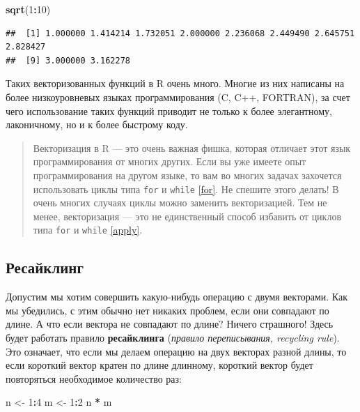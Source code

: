 \documentclass[
]{book}
\newenvironment{Shaded}{\begin{snugshade}}{\end{snugshade}}
\newcommand{\DecValTok}[1]{\textcolor[rgb]{0.00,0.00,0.81}{#1}}
\newcommand{\KeywordTok}[1]{\textcolor[rgb]{0.13,0.29,0.53}{\textbf{#1}}}
\newcommand{\NormalTok}[1]{#1}
\newcommand{\OperatorTok}[1]{\textcolor[rgb]{0.81,0.36,0.00}{\textbf{#1}}}
\newcommand{\StringTok}[1]{\textcolor[rgb]{0.31,0.60,0.02}{#1}}
\begin{document}
\begin{Shaded}
\begin{Highlighting}[]
\KeywordTok{sqrt}\NormalTok{(}\DecValTok{1}\OperatorTok{:}\DecValTok{10}\NormalTok{)}
\end{Highlighting}
\end{Shaded}

\begin{verbatim}
##  [1] 1.000000 1.414214 1.732051 2.000000 2.236068 2.449490 2.645751 2.828427
##  [9] 3.000000 3.162278
\end{verbatim}

Таких векторизованных функций в R очень много. Многие из них написаны на более низкоуровневых языках программирования (C, C++, FORTRAN), за счет чего использование таких функций приводит не только к более элегантному, лаконичному, но и к более быстрому коду.

\begin{quote}
Векторизация в R --- это очень важная фишка, которая отличает этот язык программирования от многих других. Если вы уже имеете опыт программирования на другом языке, то вам во многих задачах захочется использовать циклы типа \texttt{for} и \texttt{while} \ref{for}. Не спешите этого делать! В очень многих случаях циклы можно заменить векторизацией. Тем не менее, векторизация --- это не единственный способ избавить от циклов типа \texttt{for} и \texttt{while} \ref{apply}.
\end{quote}

\hypertarget{recycling}{%
\subsection{Ресайклинг}\label{recycling}}

Допустим мы хотим совершить какую-нибудь операцию с двумя векторами. Как мы убедились, с этим обычно нет никаких проблем, если они совпадают по длине. А что если вектора не совпадают по длине?
Ничего страшного! Здесь будет работать правило \textbf{ресайклинга} (\emph{правило переписывания, recycling rule}). Это означает, что если мы делаем операцию на двух векторах разной длины, то если короткий вектор кратен по длине длинному, короткий вектор будет повторяться необходимое количество раз:

\begin{Shaded}
\begin{Highlighting}[]
\NormalTok{n <-}\StringTok{ }\DecValTok{1}\OperatorTok{:}\DecValTok{4}
\NormalTok{m <-}\StringTok{ }\DecValTok{1}\OperatorTok{:}\DecValTok{2}
\NormalTok{n }\OperatorTok{*}\StringTok{ }\NormalTok{m}
\end{Highlighting}
\end{Shaded}
\end{document}
